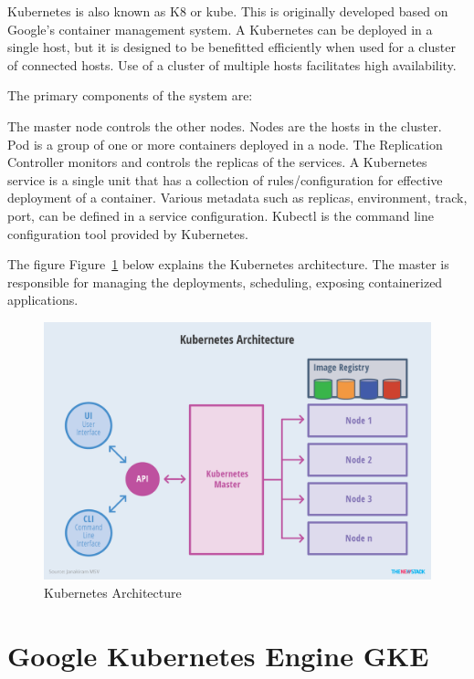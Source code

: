Kubernetes is also known as K8 or kube. This is originally developed based on 
Google’s container management system. A Kubernetes can be deployed in a single 
host, but it is designed to be benefitted efficiently when used for a cluster 
of connected hosts. Use of a cluster of multiple hosts facilitates high 
availability.


The primary components of the system are: 

The master node controls the other nodes. Nodes are the hosts in the cluster. 
Pod is a group of one or more containers deployed in a node.  The Replication
 Controller monitors and controls the replicas of the services. A Kubernetes 
 service is a single unit that has a collection of rules/configuration for 
 effective deployment of a container. Various metadata such as replicas, 
 environment, track, port, can be defined in a service configuration. 
 Kubectl is the command line configuration tool provided by Kubernetes. 

The figure Figure~\ref{fig:kube-archtecture} below explains the Kubernetes 
architecture. The master is responsible for managing the deployments, 
scheduling, exposing containerized applications.

\begin{figure}[htb]
	\centering\includegraphics[width=\columnwidth]
        {images/hid_417_Kubernetes-Architecture.png}
	\caption{Kubernetes Architecture~\cite{hid-sp18-417-kubernetes}}\label{fig:kube-archtecture}
\end{figure}

\section{ Google Kubernetes Engine GKE}

